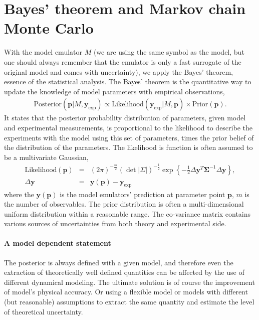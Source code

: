 \section{Bayes' theorem and Markov chain Monte Carlo}
With the model emulator $M$ (we are using the same symbol as the model, but one should always remember that the emulator is only a fast surrogate of the original model and comes with uncertainty), we apply the Bayes' theorem, essence of the statistical analysis.
The Bayes' theorem is the quantitative way to update the knowledge of model parameters with empirical observations,
\begin{eqnarray}
\mathrm{Posterior}(\mathbf{p}|M, \mathbf{y}_{\textrm{exp}}) \propto \mathrm{Likelihood}(\mathbf{y}_{\textrm{exp}}|M, \mathbf{p})\times\mathrm{Prior}(\mathbf{p}).
\end{eqnarray}
It states that the posterior probability distribution of parameters, given model and experimental measurements, is proportional to the likelihood to describe the experiments with the model using this set of parameters, times the prior belief of the distribution of the parameters.
The likelihood is function is often assumed to be a multivariate Gaussian,
\begin{eqnarray}
\mathrm{Likelihood}(\mathbf{p}) &=& (2\pi)^{-\frac{m}{2}} (\det|\Sigma|)^{-\frac{1}{2}} \exp\left\{-\frac{1}{2}\Delta \mathbf{y}^T \mathbf{\Sigma}^{-1} \Delta \mathbf{y}\right\}, \\ 
\Delta \mathbf{y} &=& \mathbf{y}(\mathbf{p}) - \mathbf{y}_{\textrm{exp}}
\end{eqnarray}
where the $\mathbf{y}(\mathbf{p})$ is the model emulators' prediction at parameter point $\mathbf{p}$, $m$ is the number of observables.
The prior distribution is often a multi-dimensional uniform distribution within a reasonable range. 
The co-variance matrix contains various sources of uncertainties from both theory and experimental side.

\paragraph{A model dependent statement} The posterior is always defined with a given model, and therefore even the extraction of theoretically well defined quantities can be affected by the use of different dynamical modeling.
The ultimate solution is of course the improvement of model's physical accuracy.
Or using a flexible model or models with different (but reasonable) assumptions to extract the same quantity and estimate the level of theoretical uncertainty.

